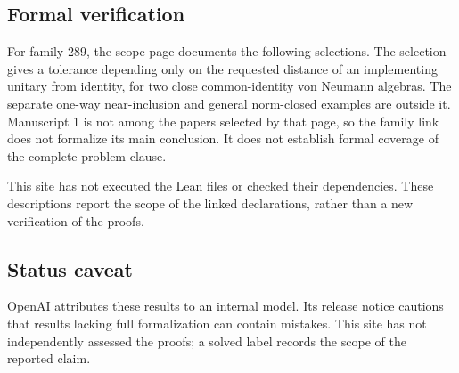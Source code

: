 \documentclass[11pt]{article}
\begin{document}
\subsection{Formal verification}
For family 289, the scope page documents the following selections. The selection gives a tolerance depending only on the requested distance of an implementing unitary from identity, for two close common-identity von Neumann algebras. The separate one-way near-inclusion and general norm-closed examples are outside it. Manuscript 1 is not among the papers selected by that page, so the family link does not formalize its main conclusion. It does not establish formal coverage of the complete problem clause.

This site has not executed the Lean files or checked their dependencies. These descriptions report the scope of the linked declarations, rather than a new verification of the proofs.

\subsection{Status caveat}
OpenAI attributes these results to an internal model. Its release notice cautions that results lacking full formalization can contain mistakes. This site has not independently assessed the proofs; a solved label records the scope of the reported claim.
\end{document}
